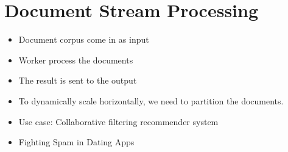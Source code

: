 \section{Document Stream Processing}
\label{sec:document-stram-processing}
\begin{itemize}
    \item Document corpus come in as input

    \item Worker process the documents
    
    \item The result is sent to the output
    
    \item To dynamically scale horizontally, we need to partition the documents.
    
    \item Use case: Collaborative filtering recommender system
    
    \item Fighting Spam in Dating Apps \cite{jugel2019fighting}
    
\end{itemize}
